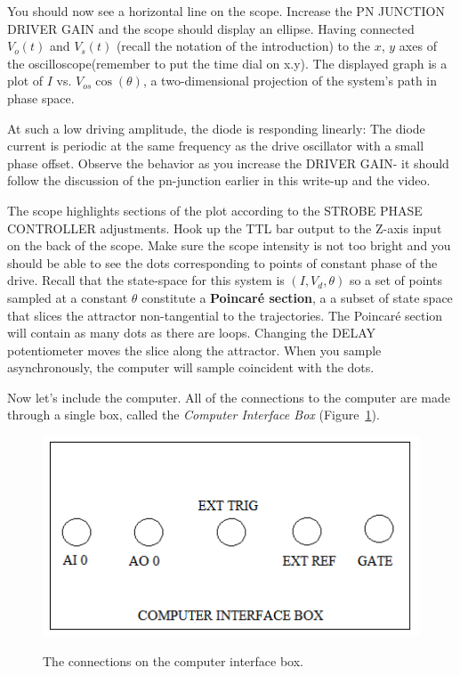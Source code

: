 \documentclass{../lab}
\begin{document}
You should now see a horizontal line on the scope. Increase the PN JUNCTION DRIVER GAIN and the scope should display an ellipse. Having connected $ V_o(t) $ and $ V_s(t) $ (recall the notation of the introduction) to the $x$, $y$ axes of the oscilloscope(remember to put the time dial on x.y). The displayed graph is a plot of $I$ vs. $V_{os} \cos(\theta)$, a two-dimensional projection of the system's path in phase space.

At such a low driving amplitude, the diode is responding linearly: The diode current is periodic at the same frequency as the drive oscillator with a small phase offset. Observe the behavior as you increase the DRIVER GAIN- it should follow the discussion of the pn-junction earlier in this write-up and the video.

The scope highlights sections of the plot according to the STROBE PHASE CONTROLLER adjustments. Hook up the TTL bar output to the Z-axis input on the back of the scope. Make sure the scope intensity is not too bright and you should be able to see the dots corresponding to points of constant phase of the drive. Recall that the state-space for this system is $(I, V_d,\theta)$ so a set of points sampled at a constant $\theta$ constitute a \textbf{Poincaré section}, a a subset of state space that slices the attractor non-tangential to the trajectories. The Poincaré section will contain as many dots as there are loops. Changing the DELAY potentiometer moves the slice along the attractor. When you sample asynchronously, the computer will sample coincident with the dots.

Now let's include the computer. All of the connections to the computer are made through a single box, called the \emph{Computer Interface Box} (Figure~\ref{fig:ConnectionsOnComputerInterfaceBox}).

\begin{figure}[h]
    \centering
    \href{http://experimentationlab.berkeley.edu/sites/default/files/images/NLD_DAQBOX.png}{\includegraphics[width=0.5\linewidth]{images/NLD_DAQBOX.png}}
    \caption{The connections on the computer interface box.}
    \label{fig:ConnectionsOnComputerInterfaceBox}
\end{figure}
\end{document}
